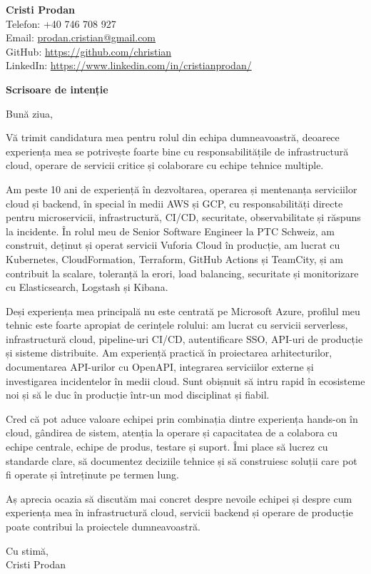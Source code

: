 \documentclass[11pt,a4paper]{article}
\begin{document}
{\LARGE \textbf{Cristi Prodan}}\\
Telefon: +40 746 708 927\\
Email: \href{mailto:prodan.cristian@gmail.com}{prodan.cristian@gmail.com}\\
GitHub: \href{https://github.com/christian}{https://github.com/christian}\\
LinkedIn: \href{https://www.linkedin.com/in/cristianprodan/}{https://www.linkedin.com/in/cristianprodan/}

\vspace{1.2em}

{\Large \textbf{Scrisoare de intenție}}

Bună ziua,

Vă trimit candidatura mea pentru rolul din echipa dumneavoastră, deoarece experiența mea se potrivește foarte bine cu responsabilitățile de infrastructură cloud, operare de servicii critice și colaborare cu echipe tehnice multiple.

Am peste 10 ani de experiență în dezvoltarea, operarea și mentenanța serviciilor cloud și backend, în special în medii AWS și GCP, cu responsabilități directe pentru microservicii, infrastructură, CI/CD, securitate, observabilitate și răspuns la incidente. În rolul meu de Senior Software Engineer la PTC Schweiz, am construit, deținut și operat servicii Vuforia Cloud în producție, am lucrat cu Kubernetes, CloudFormation, Terraform, GitHub Actions și TeamCity, și am contribuit la scalare, toleranță la erori, load balancing, securitate și monitorizare cu Elasticsearch, Logstash și Kibana.

Deși experiența mea principală nu este centrată pe Microsoft Azure, profilul meu tehnic este foarte apropiat de cerințele rolului: am lucrat cu servicii serverless, infrastructură cloud, pipeline-uri CI/CD, autentificare SSO, API-uri de producție și sisteme distribuite. Am experiență practică în proiectarea arhitecturilor, documentarea API-urilor cu OpenAPI, integrarea serviciilor externe și investigarea incidentelor în medii cloud. Sunt obișnuit să intru rapid în ecosisteme noi și să le duc în producție într-un mod disciplinat și fiabil.

Cred că pot aduce valoare echipei prin combinația dintre experiența hands-on în cloud, gândirea de sistem, atenția la operare și capacitatea de a colabora cu echipe centrale, echipe de produs, testare și suport. Îmi place să lucrez cu standarde clare, să documentez deciziile tehnice și să construiesc soluții care pot fi operate și întreținute pe termen lung.

Aș aprecia ocazia să discutăm mai concret despre nevoile echipei și despre cum experiența mea în infrastructură cloud, servicii backend și operare de producție poate contribui la proiectele dumneavoastră.

Cu stimă,\\
Cristi Prodan
\end{document}
